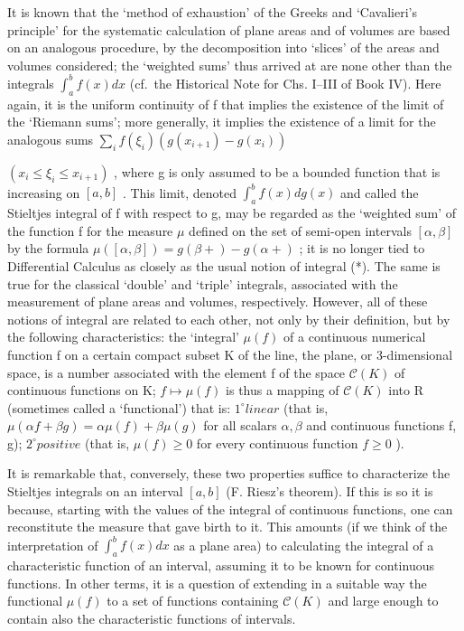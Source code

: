 It is known that the `method of exhaustion' of the Greeks and `Cavalieri's principle' for the systematic calculation of plane areas and of volumes are based on an analogous procedure, by the decomposition into `slices' of the areas and volumes considered; the `weighted sums' thus arrived at are none other than the integrals \(\int_{a}^{b} f(x) dx\) (cf.~the Historical Note for Chs. I--III of Book IV). Here again, it is the uniform continuity of f that implies the existence of the limit of the `Riemann sums'; more generally, it implies the existence of a limit for the analogous sums \(\sum_{i} f(\xi_{i})(g(x_{i+1}) - g(x_{i}))\)

\((x_{i} \leqslant \xi_{i} \leqslant x_{i+1})\) , where g is only assumed to be a bounded function that is increasing on \([a, b]\) . This limit, denoted \(\int_{a}^{b} f(x) dg(x)\) and called the Stieltjes integral of f with respect to g, may be regarded as the `weighted sum' of the function f for the measure \(\mu\) defined on the set of semi-open intervals \([\alpha, \beta]\) by the formula \(\mu([\alpha, \beta]) = g(\beta+) - g(\alpha+)\) ; it is no longer tied to Differential Calculus as closely as the usual notion of integral (*). The same is true for the classical `double' and `triple' integrals, associated with the measurement of plane areas and volumes, respectively. However, all of these notions of integral are related to each other, not only by their definition, but by the following characteristics: the `integral' \(\mu(f)\) of a continuous numerical function f on a certain compact subset K of the line, the plane, or 3-dimensional space, is a number associated with the element f of the space \(\mathcal{C}(K)\) of continuous functions on K; \(f \mapsto \mu(f)\) is thus a mapping of \(\mathcal{C}(K)\) into R (sometimes called a `functional') that is: \(1^{\circ} linear\) (that is, \(\mu(\alpha f + \beta g) = \alpha \mu(f) + \beta \mu(g)\) for all scalars \(\alpha, \beta\) and continuous functions f, g); \(2^{\circ} positive\) (that is, \(\mu(f) \geqslant 0\) for every continuous function \(f \geqslant 0\) ).

It is remarkable that, conversely, these two properties suffice to characterize the Stieltjes integrals on an interval \([a,b]\) (F. Riesz's theorem). If this is so it is because, starting with the values of the integral of continuous functions, one can reconstitute the measure that gave birth to it. This amounts (if we think of the interpretation of \(\int_{a}^{b}f(x)dx\) as a plane area) to calculating the integral of a characteristic function of an interval, assuming it to be known for continuous functions. In other terms, it is a question of extending in a suitable way the functional \(\mu(f)\) to a set of functions containing \(\mathcal{C}(K)\) and large enough to contain also the characteristic functions of intervals.

